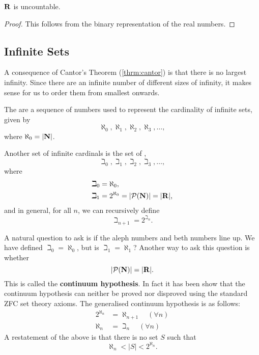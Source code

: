 \begin{corollary}
$\mathbf R$ is uncountable.
\end{corollary}

\begin{proof}
This follows from the binary representation of the real numbers.
\end{proof}

\subsection{Infinite Sets}
A consequence of Cantor's Theorem (\cref{thrm:cantor}) is that there is no largest infinity. Since there are an infinite number of different sizes of infinity, it makes sense for us to order them from smallest onwards.

The  are a sequence of numbers used to represent the cardinality of infinite sets, given by
\[\aleph_0,\aleph_1,\aleph_2,\aleph_3,\dots,\]
where $\aleph_0=|\mathbf N|$.

Another set of infinite cardinals is the set of ,
\[\beth_0,\beth_1,\beth_2,\beth_3,\dots,\]
where
\begin{align*}
\beth_0&=\aleph_0,\\
\beth_1&=2^{\aleph_0}=|\mathcal{P}(\mathbf N)|=|\mathbf R|,
\end{align*}
and in general, for all $n$, we can recursively define
\[\beth_{n+1}=2^{\beth_n}.\]

A natural question to ask is if the aleph numbers and beth numbers line up. We have defined $\beth_0=\aleph_0$, but is $\beth_1=\aleph_1$? Another way to ask this question is whether
\[|\mathcal{P}(\mathbf N)|=|\mathbf R|.\]
This is called the \textbf{continuum hypothesis}. In fact it has been show that the continuum hypothesis can neither be proved nor disproved using the standard ZFC set theory axioms. The generalised continuum hypothesis is as follows:
\begin{align*}
2^{\aleph_n}&=\aleph_{n+1}\quad(\forall n)\\
\aleph_n&=\beth_n\quad(\forall n)
\end{align*}
A restatement of the above is that there is no set $S$ such that
\[\aleph_n<|S|<2^{\aleph_n}.\]
\pagebreak

